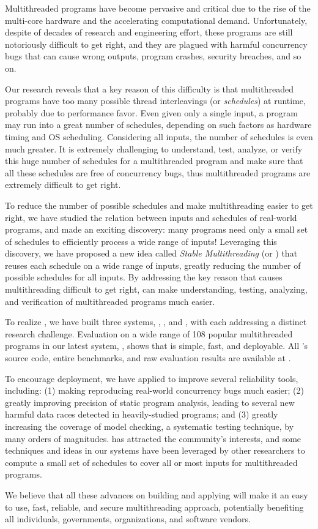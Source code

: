 Multithreaded programs have become pervasive and critical due to the rise of the
multi-core hardware and the accelerating computational demand.
Unfortunately, despite of decades of research and engineering effort, these
programs are still notoriously difficult to get right, and they are plagued with
harmful concurrency bugs that can cause wrong outputs, program crashes, security
breaches, and so on.

Our research reveals that a key reason of this difficulty is
that multithreaded programs have too many possible thread interleavings (or
\emph{schedules}) at runtime, probably due to performance favor. Even given 
only a single input, a program may run into a great number of schedules, 
depending on such factors as hardware timing and OS scheduling. Considering all 
inputs, the number of schedules is even much greater. It is extremely 
challenging to understand, test, analyze, or verify this huge number of 
schedules for a multithreaded program and make sure that all these schedules 
are free of concurrency bugs, thus multithreaded programs are extremely 
difficult to get right.

To reduce the number of possible schedules and make multithreading
easier to get right, we have studied the relation between inputs and schedules 
of real-world programs, and made an exciting discovery: many programs need only 
a small set of schedules to efficiently process a wide range of inputs! 
Leveraging this discovery, we have proposed a new idea called \emph{Stable 
Multithreading} (or \emph{\smt}) that reuses each schedule on a wide range of 
inputs, greatly reducing the number of possible schedules for all inputs. By 
addressing the key reason that causes multithreading difficult to get right, 
\smt can make understanding, testing, analyzing, and verification of 
multithreaded programs much easier.

To realize \smt, we have built three \smt systems, \tern, \peregrine, and 
\parrot, with each addressing a distinct research challenge. Evaluation on a 
wide range of 108 popular multithreaded programs in our latest \smt system, 
\parrot, shows that \smt is simple, fast, and deployable. All \parrot's source 
code, entire benchmarks, and raw evaluation results are available at \github.

To encourage deployment, we have applied \smt to improve several reliability 
tools, including: (1) making reproducing
real-world concurrency bugs much easier;  (2) greatly improving precision of
static program analysis, leading to several new harmful data races detected in
heavily-studied programs; and (3) greatly increasing the coverage of model 
checking, a systematic testing technique, by many orders of magnitudes. \smt 
has attracted the community's interests, and some techniques and ideas in our 
\smt systems have been leveraged by other researchers to compute a small set of 
schedules to cover all or most inputs for multithreaded programs.

We believe that all these advances on building and applying \smt will make it 
an easy to use, fast, reliable, and secure multithreading approach, potentially 
benefiting all individuals, governments, organizations, and software vendors. 

